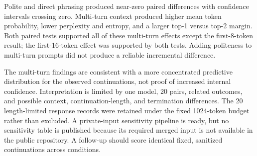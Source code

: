 Polite and direct phrasing produced near-zero paired differences with
confidence intervals crossing zero. Multi-turn context produced higher mean
token probability, lower perplexity and entropy, and a larger top-1 versus
top-2 margin. Both paired tests supported all of these multi-turn effects
except the first-8-token result; the first-16-token effect was supported by
both tests. Adding politeness to multi-turn prompts did not produce a reliable
incremental difference.

The multi-turn findings are consistent with a more concentrated predictive
distribution for the observed continuations, not proof of increased internal
confidence. Interpretation is limited by one model, 20 pairs, related outcomes,
and possible context, continuation-length, and termination differences. The 20
length-limited response records were retained under the fixed 1024-token
budget rather than excluded. A private-input sensitivity pipeline is ready,
but no sensitivity table is published because its required merged input is not
available in the public repository. A follow-up should score identical fixed,
sanitized continuations across conditions.
